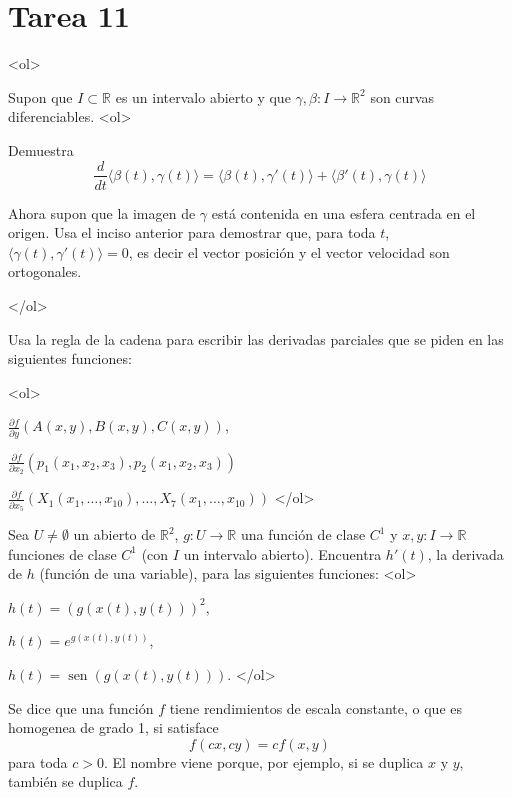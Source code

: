 \documentclass{article}
\theoremstyle{definition}
\newcommand{\sen}{\operatorname{sen}}
\begin{document}
\section*{Tarea 11 }


<ol>


  \item Supon que $I\subset \mathbb{R}$ es un intervalo abierto
    y que $\gamma,\beta :I\to \mathbb{R}^2$  son curvas diferenciables.
    <ol>
      \item Demuestra
        $$
        \frac{d}{dt} \langle \beta(t), \gamma(t) \rangle
        =\langle \beta(t), \gamma'(t) \rangle
        + \langle \beta'(t) , \gamma(t) \rangle
        $$
      \item Ahora supon que la imagen de $\gamma$ está contenida
        en una esfera centrada en el origen. Usa el inciso anterior
        para demostrar que, para toda $t$,
        $\langle \gamma(t), \gamma'(t)\rangle=0$, es decir
        el vector posición y el vector velocidad son ortogonales.

      </ol>
      
  \item Usa la regla de la cadena para escribir las derivadas 
    parciales que se piden en las siguientes funciones:

    <ol>
    \item $\frac{\partial f}{\partial y}(A(x,y),B(x,y),C(x,y))$,
    \item $\frac{\partial f}{\partial x_2}(p_1(x_1,x_2,x_3),p_2(x_1,x_2,x_3))$
    \item $\frac{\partial f}{\partial x_5}
      (X_1(x_1, \dots, x_{10}), \dots, X_{7}(x_1,\dots, x_{10}))$
    </ol>

\item Sea $U\ne \emptyset$ un abierto de
  $\mathbb{R}^2$, $g:U\to \mathbb{R}$ una función de clase $C^1$
  y $x,y:I\to \mathbb{R}$ funciones  de clase $C^1$
  (con $I$ un intervalo abierto).
  Encuentra $h'(t)$, la derivada de
  $h$ (función de una variable), para las siguientes funciones:
  <ol>
  \item $h(t)=(g(x(t), y(t)))^2$,
  \item $h(t)=e^{g(x(t),y(t))}$,
  \item $h(t)=\sen(g(x(t),y(t)))$.
  </ol>


\item Se dice que una función $f$ tiene rendimientos de escala constante,
  o que es homogenea de grado 1, si satisface
  \begin{equation}\label{Eqn:RendimientoEscala}
  f(cx,cy)=cf(x,y)
  \end{equation}
  para toda $c>0$. El nombre viene porque, por ejemplo,
  si se duplica $x$ y $y$, también se duplica $f$.
\end{document}
